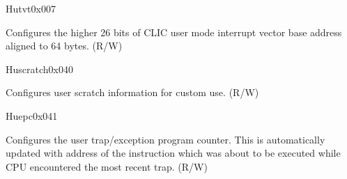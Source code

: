 \begin{register}{H}{utvt}{0x007}\label{regdesc:UTVT}
%
%
\regnewline%
\begin{regdesc}\begin{reglist}
\label{fielddesc:UTVTBASE}\item [BASE] Configures the higher 26 bits of CLIC user mode interrupt vector base address aligned to 64 bytes. (R/W)
\end{reglist}\end{regdesc}
\end{register}

\begin{register}{H}{uscratch}{0x040}\label{regdesc:USCRATCH}
%
\regnewline%
\begin{regdesc}\begin{reglist}
\label{fielddesc:USCRATCH}\item [USCRATCH] Configures user scratch information for custom use. (R/W)
\end{reglist}\end{regdesc}
\end{register}

\begin{register}{H}{uepc}{0x041}\label{regdesc:UEPC}
%
\regnewline%
\begin{regdesc}\begin{reglist}
\label{fielddesc:UEPC}\item [UEPC] Configures the user trap/exception program counter. This is automatically updated with address of the instruction which was about to be executed while CPU encountered the most recent trap. (R/W)
\end{reglist}\end{regdesc}
\end{register}

